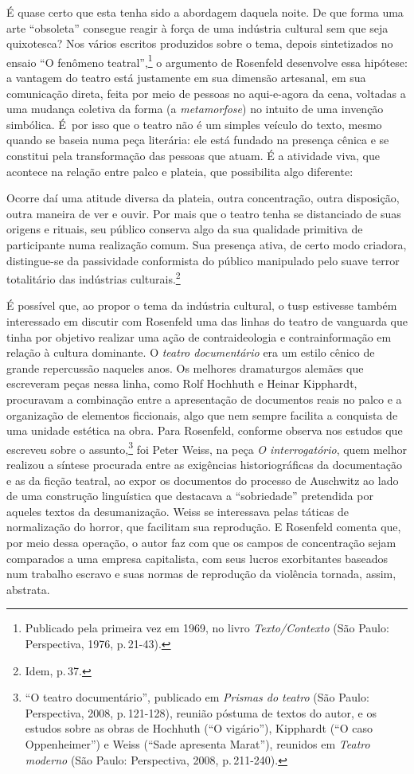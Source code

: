 É quase certo que esta tenha sido a abordagem daquela noite. De que
forma uma arte “obsoleta” consegue reagir à força de uma indústria
cultural sem que seja quixotesca? Nos vários escritos produzidos
sobre o tema, depois sintetizados no ensaio “O fenômeno teatral”,\footnote{Publicado pela primeira vez em 1969, no livro
{\it Texto/Contexto} (São Paulo: Perspectiva, 1976, p.\,21-43).}
o argumento de Rosenfeld desenvolve essa hipótese: a vantagem do teatro
está justamente em sua dimensão artesanal, em sua comunicação direta,
feita por meio de pessoas no aqui-e-agora da cena, voltadas a uma
mudança coletiva da forma (a {\it metamorfose}) no intuito de uma
invenção simbólica. É~por isso que o teatro não é um simples veículo do
texto, mesmo quando se baseia numa peça literária: ele está fundado na
presença cênica e se constitui pela transformação das pessoas que atuam.
É a atividade viva, que acontece na relação entre palco e plateia, que
possibilita algo diferente:

\startblockquote
Ocorre daí uma atitude diversa da plateia, outra concentração, outra
disposição, outra maneira de ver e ouvir. Por mais que o teatro tenha se
distanciado de suas origens e rituais, seu público conserva algo da sua
qualidade primitiva de participante numa realização comum. Sua presença
ativa, de certo modo criadora, distingue-se da passividade conformista
do público manipulado pelo suave terror totalitário das indústrias
culturais.\footnote{Idem, p.\,37.}
\stopblockquote

É possível que, ao propor o tema da indústria cultural, o {\sc tusp} estivesse
também interessado em discutir com Rosenfeld uma das linhas do teatro de
vanguarda que tinha por objetivo realizar uma ação de contraideologia e
contrainformação em relação à cultura dominante. O {\it teatro
documentário} era um estilo cênico de grande repercussão naqueles anos.
Os melhores dramaturgos alemães que escreveram peças nessa linha,
como Rolf Hochhuth e Heinar Kipphardt, procuravam a combinação
entre a apresentação de documentos reais no palco e a organização de
elementos ficcionais, algo que nem sempre facilita a conquista de uma
unidade estética na obra. Para Rosenfeld, conforme observa nos estudos
que escreveu sobre o assunto,\footnote{“O teatro documentário”,
  publicado em {\it Prismas do teatro} (São Paulo: Perspectiva, 2008, p.\,121-128), reunião póstuma de textos do autor, e os estudos sobre as
  obras de Hochhuth (“O vigário”), Kipphardt (“O caso
  Oppenheimer”) e Weiss (“Sade apresenta Marat”), reunidos em
  {\it Teatro moderno} (São Paulo: Perspectiva, 2008, p.\,211-240).} foi
Peter Weiss, na peça {\it O interrogatório}, quem melhor realizou a
síntese procurada entre as exigências historiográficas da documentação e
as da ficção teatral, ao expor os documentos do processo de Auschwitz ao
lado de uma construção linguística que destacava a “sobriedade”
pretendida por aqueles textos da desumanização. Weiss se interessava pelas
táticas de normalização do horror, que facilitam sua reprodução. E
Rosenfeld comenta que, por meio dessa operação, o autor faz com que os
campos de concentração sejam comparados a uma empresa capitalista, com
seus lucros exorbitantes baseados num trabalho escravo e suas
normas de reprodução da violência tornada, assim, abstrata.

